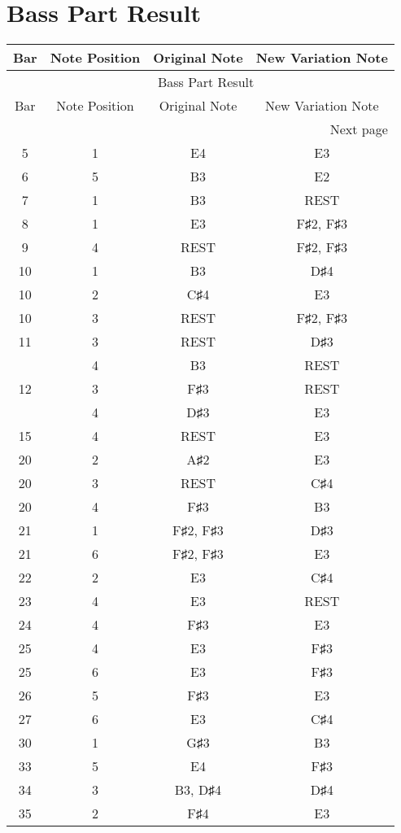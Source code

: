 \documentclass{article}
\begin{document}
\section*{Bass Part Result}
\begin{longtable}{|c|c|c|c|}
\hline
Bar & Note Position & Original Note & New Variation Note \\ \hline
\endfirsthead
\multicolumn{4}{c}{{\tablename\ \thetable{} Bass Part Result}} \\
\hline
Bar & Note Position & Original Note & New Variation Note \\ \hline
\hline
\endhead
\hline
\multicolumn{4}{r}{Next page}\endfoot
\hline
\endlastfoot
\hline
4 & 3 & D♯4 & B3, D♯4 \\ 
\hline
5 & 1 & E4 & E3 \\ 
\hline
6 & 5 & B3 & E2 \\ 
\hline
7 & 1 & B3 & REST \\ 
\hline
8 & 1 & E3 & F♯2, F♯3 \\ 
\hline
9 & 4 & REST & F♯2, F♯3 \\ 
\hline
10 & 1 & B3 & D♯4 \\ 
\hline
10 & 2 & C♯4 & E3 \\ 
\hline
10 & 3 & REST & F♯2, F♯3 \\ 
\hline
11 & 3 & REST & D♯3 \\ 
  & 4 & B3 & REST \\ 
\hline
12 & 3 & F♯3 & REST \\ 
  & 4 & D♯3 & E3 \\ 
\hline
15 & 4 & REST & E3 \\ 
\hline
20 & 2 & A♯2 & E3 \\ 
\hline
20 & 3 & REST & C♯4 \\ 
\hline
20 & 4 & F♯3 & B3 \\ 
\hline
21 & 1 & F♯2, F♯3 & D♯3 \\ 
\hline
21 & 6 & F♯2, F♯3 & E3 \\ 
\hline
22 & 2 & E3 & C♯4 \\ 
\hline
23 & 4 & E3 & REST \\ 
\hline
24 & 4 & F♯3 & E3 \\ 
\hline
25 & 4 & E3 & F♯3 \\ 
\hline
25 & 6 & E3 & F♯3 \\ 
\hline
26 & 5 & F♯3 & E3 \\ 
\hline
27 & 6 & E3 & C♯4 \\ 
\hline
30 & 1 & G♯3 & B3 \\ 
\hline
33 & 5 & E4 & F♯3 \\ 
\hline
34 & 3 & B3, D♯4 & D♯4 \\ 
\hline
35 & 2 & F♯4 & E3 \\ 
\hline
\end{longtable}
\end{document}

